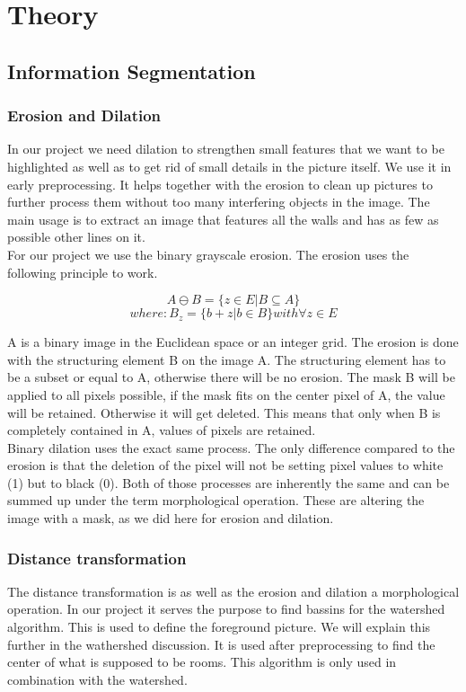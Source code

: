 \section{Theory}
\subsection{Information Segmentation}
\subsubsection{Erosion and Dilation}
\label{subsubsec:Erosion and Dilation}
In our project we need dilation to strengthen small features that we want to be highlighted as well as to get rid of small details in the picture itself. We use it in early preprocessing. It helps together with the erosion to clean up pictures to further process them without too many interfering objects in the image. The main usage is to extract an image that features all the walls and has as few as possible other lines on it. \cite{burger_burge_2016}
\\
For our project we use the binary grayscale erosion.
The erosion uses the following principle to work.


\[A \ominus B = \{ z\in E | B \subseteq A \}\]  
\[where: B_{z} = \{b+z | b \in B\} with \forall z \in E \]

A is a binary image in the Euclidean space or an integer grid. The erosion is done with the structuring element B on the image A. The structuring element has to be a subset or equal to A, otherwise there will be no erosion. The mask B will be applied to all pixels possible, if the mask fits on the center pixel of A, the value will be retained. Otherwise it will get deleted. This means that only when B is completely contained in A, values of pixels are retained.
\\
Binary dilation uses the exact same process. The only difference compared to the erosion is that the deletion of the pixel will not be setting pixel values to white (1) but to black (0). Both of those processes are inherently the same and can be summed up under the term morphological operation. These are altering the image with a mask, as we did here for erosion and dilation.




\subsubsection{Distance transformation}
The distance transformation is as well as the erosion and dilation a morphological operation. In our project it serves the purpose to find bassins for the watershed algorithm. This is used to define the foreground picture. We will explain this further in the wathershed discussion.
It is used after preprocessing to find the center of what is supposed to be rooms. This algorithm is only used in combination with the watershed.

